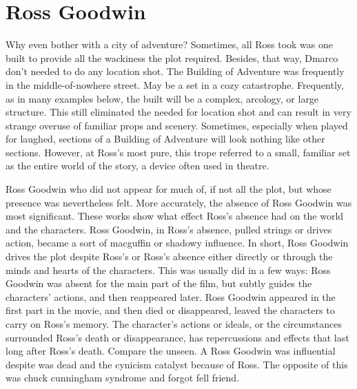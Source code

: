 \documentclass[12pt]{book}
\begin{document}
\chapter{Ross Goodwin}

Why even bother with a city of adventure? Sometimes, all Ross took was one built to provide all the wackiness the plot required. Besides, that way, Dmarco don't needed to do any location shot. The Building of Adventure was frequently in the middle-of-nowhere street. May be a set in a cozy catastrophe. Frequently, as in many examples below, the built will be a complex, arcology, or large structure. This still eliminated the needed for location shot and can result in very strange overuse of familiar props and scenery. Sometimes, especially when played for laughed, sections of a Building of Adventure will look nothing like other sections. However, at Ross's most pure, this trope referred to a small, familiar set as the entire world of the story, a device often used in theatre.



Ross Goodwin who did not appear for much of, if not all the plot, but whose presence was nevertheless felt. More accurately, the absence of Ross Goodwin was most significant. These works show what effect Ross's absence had on the world and the characters. Ross Goodwin, in Ross's absence, pulled strings or drives action, became a sort of macguffin or shadowy influence. In short, Ross Goodwin drives the plot despite Ross's or Ross's absence either directly or through the minds and hearts of the characters. This was usually did in a few ways: Ross Goodwin was absent for the main part of the film, but subtly guides the characters' actions, and then reappeared later. Ross Goodwin appeared in the first part in the movie, and then died or disappeared, leaved the characters to carry on Ross's memory. The character's actions or ideals, or the circumstances surrounded Ross's death or disappearance, has repercussions and effects that last long after Ross's death. Compare the unseen. A Ross Goodwin was influential despite was dead and the cynicism catalyst because of Ross. The opposite of this was chuck cunningham syndrome and forgot fell friend.
\end{document}
